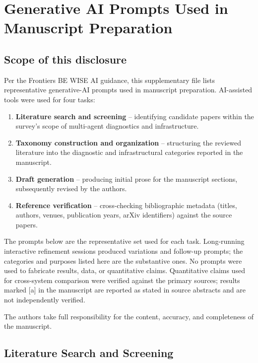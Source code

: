 \documentclass[utf8]{frontiers_suppmat}
\begin{document}
\onecolumn
{}

\section{Generative AI Prompts Used in Manuscript Preparation}

\subsection{Scope of this disclosure}

Per the Frontiers BE WISE AI guidance, this supplementary file lists representative generative-AI prompts used in manuscript preparation. AI-assisted tools were used for four tasks:

\begin{enumerate}
  \item \textbf{Literature search and screening} -- identifying candidate
        papers within the survey's scope of multi-agent diagnostics and
        infrastructure.
  \item \textbf{Taxonomy construction and organization} -- structuring the
        reviewed literature into the diagnostic and infrastructural
        categories reported in the manuscript.
  \item \textbf{Draft generation} -- producing initial prose for the
        manuscript sections, subsequently revised by the authors.
  \item \textbf{Reference verification} -- cross-checking bibliographic
        metadata (titles, authors, venues, publication years, arXiv
        identifiers) against the source papers.
\end{enumerate}

The prompts below are the representative set used for each task. Long-running interactive refinement sessions produced variations and follow-up prompts; the categories and purposes listed here are the substantive ones. No prompts were used to fabricate results, data, or quantitative claims. Quantitative claims used for cross-system comparison were verified against the primary sources; results marked [a] in the manuscript are reported as stated in source abstracts and are not independently verified.

The authors take full responsibility for the content, accuracy, and completeness of the manuscript.

\subsection{Literature Search and Screening}
\end{document}
